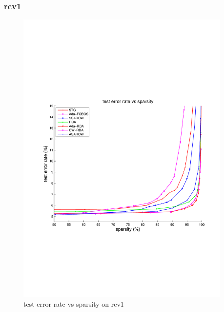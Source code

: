 \documentclass{article}
\begin{document}
\subsubsection{rcv1}
\begin{figure}[!h]
\centering
\includegraphics[width=0.95\textwidth]{./figs/rcv1_test.pdf}
\caption{test error rate vs sparsity on rcv1}
\label{fig:02}
\end{figure}
\end{document}
